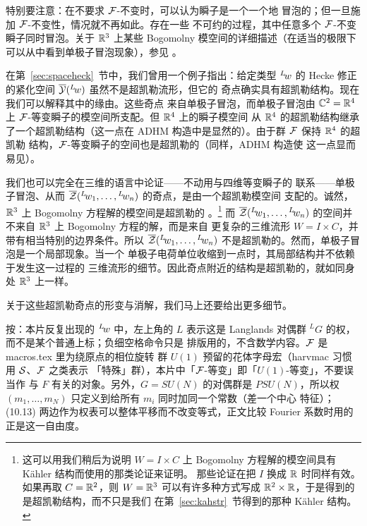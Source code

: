 特别要注意：在不要求 ${\EUF}$-不变时，可以认为瞬子是一个一个地
冒泡的；但一旦施加 ${\EUF}$-不变性，情况就不再如此。存在一些
不可约的过程，其中任意多个 ${\EUF}$-不变瞬子同时冒泡。关于
$\Bbb{R}^3$ 上某些 Bogomolny 模空间的详细描述（在适当的极限下
可以从中看到单极子冒泡现象），参见 \cite{ref112,ref113}。

\par{}

在第~\ref{sec:spaceheck}~节中，我们曾用一个例子指出：给定类型
$^L\negthinspace w$ 的 Hecke 修正的紧化空间
$\bar {{\EUY}}(^L\negthinspace w)$ 虽然不是超凯勒流形，但它的
奇点确实具有超凯勒结构。现在我们可以解释其中的缘由。这些奇点
来自单极子冒泡，而单极子冒泡由 $\Bbb{C}^2=\Bbb{R}^4$ 上
${\EUF}$-等变瞬子的模空间所支配。但 $\Bbb{R}^4$ 上的瞬子模空间
从 $\Bbb{R}^4$ 的超凯勒结构继承了一个超凯勒结构（这一点在 ADHM
构造中是显然的）。由于群 ${\EUF}$ 保持 $\Bbb{R}^4$ 的超凯勒
结构，${\EUF}$-等变瞬子的空间也是超凯勒的（同样，ADHM 构造使
这一点显而易见）。

我们也可以完全在三维的语言中论证——不动用与四维等变瞬子的
联系——单极子冒泡、从而 $\bar {{\EUZ}}({}^L\negthinspace
w_1,\dots,{}^L\negthinspace w_n)$ 的奇点，是由一个超凯勒模空间
支配的。诚然，$\Bbb{R}^3$ 上 Bogomolny 方程解的模空间是超凯勒的
\cite{ref109}。\footnote{这可以用我们稍后为说明 $W=I\times C$ 上
Bogomolny 方程解的模空间具有 Kähler 结构而使用的那类论证来证明。
那些论证在把 $I$ 换成 $\Bbb{R}$ 时同样有效。如果再取
$C=\Bbb{R}^2$，则 $W=\Bbb{R}^3$ 可以有许多种方式写成
$\Bbb{R}^2\times \Bbb{R}$，于是得到的是超凯勒结构，而不只是我们
在第~\ref{sec:kahstr}~节得到的那种 Kähler 结构。} 而
$\bar {{\EUZ}}({}^L\negthinspace w_1,\dots,{}^L\negthinspace
w_n)$ 的空间并不来自 $\Bbb{R}^3$ 上 Bogomolny 方程的解，而是来自
更复杂的三维流形 $W=I \times C$，并带有相当特别的边界条件。所以
$\bar {{\EUZ}}({}^L\negthinspace w_1,\dots,{}^L\negthinspace
w_n)$ 不是超凯勒的。然而，单极子冒泡是一个局部现象。当一个
单极子电荷单位收缩到一点时，其局部结构并不依赖于发生这一过程的
三维流形的细节。因此奇点附近的结构是超凯勒的，就如同身处
$\Bbb{R}^3$ 上一样。

关于这些超凯勒奇点的形变与消解，我们马上还要给出更多细节。

\begin{yizhu}[易错点]
按：本片反复出现的 $^L\negthinspace w$ 中，左上角的 $L$ 表示这是
Langlands 对偶群 ${}^LG$ 的权，而不是某个普通上标；负细空格命令只是
排版用的，不含数学内容。${\EUF}$ 是 macros.tex 里为绕原点的相位旋转
群 $U(1)$ 预留的花体字母宏（harvmac 习惯用 ${\EUS}$、${\EUF}$ 之类表示
「特殊」群），本片中「${\EUF}$-等变」即「$U(1)$-等变」，不要误当作
与 $F$ 有关的对象。另外，$G=SU(N)$ 的对偶群是 $PSU(N)$，所以权
$(m_1,\dots,m_N)$ 只定义到给所有 $m_i$ 同时加同一个常数（差一个中心
特征）；(10.13) 两边作为权表可以整体平移而不改变等式，正文比较
Fourier 系数时用的正是这一自由度。
\end{yizhu}


